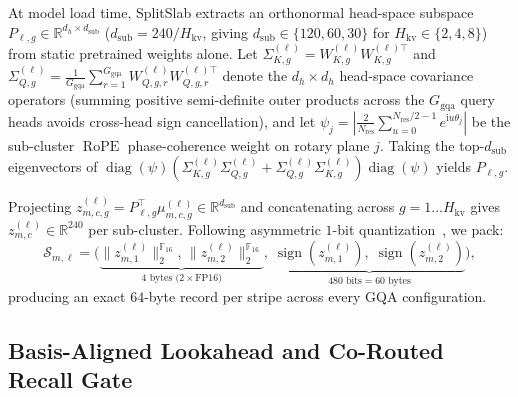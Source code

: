 \documentclass[final,5p,times,twocolumn]{elsarticle}
\theoremstyle{definition}
\theoremstyle{remark}
\newcommand{\SplitSlab}{\textup{\textsc{SplitSlab}}}
\newcommand{\RoPE}{\operatorname{RoPE}}
\newcommand{\R}{\mathbb{R}}
\def\SplitSlab{SplitSlab}%
\begin{document}
At model load time, \SplitSlab{} extracts an orthonormal head-space subspace $P_{\ell,g} \in \R^{d_h \times d_{\mathrm{sub}}}$ ($d_{\mathrm{sub}} = 240 / H_{\mathrm{kv}}$, giving $d_{\mathrm{sub}} \in \{120, 60, 30\}$ for $H_{\mathrm{kv}} \in \{2,4,8\}$) from static pretrained weights alone. Let $\Sigma_{K,g}^{(\ell)} = W_{K,g}^{(\ell)} W_{K,g}^{(\ell)\top}$ and $\Sigma_{Q,g}^{(\ell)} = \frac{1}{G_{\mathrm{gqa}}}\sum_{r=1}^{G_{\mathrm{gqa}}} W_{Q,g,r}^{(\ell)} W_{Q,g,r}^{(\ell)\top}$ denote the $d_h \times d_h$ head-space covariance operators (summing positive semi-definite outer products across the $G_{\mathrm{gqa}}$ query heads avoids cross-head sign cancellation), and let $\psi_j = |\frac{2}{N_{\mathrm{res}}}\sum_{u=0}^{N_{\mathrm{res}}/2-1} e^{\mathrm{i} u \theta_j}|$ be the sub-cluster $\RoPE$ phase-coherence weight on rotary plane $j$. Taking the top-$d_{\mathrm{sub}}$ eigenvectors of $\operatorname{diag}(\psi)(\Sigma_{K,g}^{(\ell)}\Sigma_{Q,g}^{(\ell)} + \Sigma_{Q,g}^{(\ell)}\Sigma_{K,g}^{(\ell)})\operatorname{diag}(\psi)$ yields $P_{\ell,g}$.

Projecting $z_{m,c,g}^{(\ell)} = P_{\ell,g}^\top \mu_{m,c,g}^{(\ell)} \in \R^{d_{\mathrm{sub}}}$ and concatenating across $g=1\dots H_{\mathrm{kv}}$ gives $z_{m,c}^{(\ell)} \in \R^{240}$ per sub-cluster. Following asymmetric $1$-bit quantization~\cite{charikar2002simhash,gao2024rabitq}, we pack:
\begin{equation}\label{eq:sketch_pack}
\mathcal{S}_{m,\ell} = \Big(\underbrace{\|z_{m,1}^{(\ell)}\|_2^{\mathbb{F}_{16}},\, \|z_{m,2}^{(\ell)}\|_2^{\mathbb{F}_{16}}}_{4\text{ bytes (2}\times\text{FP16)}},\; \underbrace{\operatorname{sign}(z_{m,1}^{(\ell)}),\; \operatorname{sign}(z_{m,2}^{(\ell)})}_{480\text{ bits} = 60\text{ bytes}}\Big),
\end{equation}
producing an exact $64$-byte record per stripe across every GQA configuration.

\subsection{Basis-Aligned Lookahead and Co-Routed Recall Gate}\label{subsec:lookahead}
\end{document}
